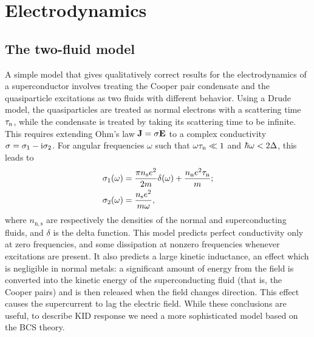 \section{Electrodynamics}
\label{sec:theory.electrodynamics}

\subsection{The two-fluid model}
\label{sec:theory.electrodynamics.two-fluid}


A simple model that gives qualitatively correct results for the electrodynamics of a superconductor involves treating the Cooper pair condensate and the quasiparticle excitations as two fluids with different behavior.
Using a Drude model, the quasiparticles are treated as normal electrons with a scattering time $\tau_{\mathrm{n}}$, while the condensate is treated by taking its scattering time to be infinite.
This requires extending Ohm's law
$\vb{J} = \sigma \vb{E}$
to a complex conductivity
$\sigma = \sigma_1 - \mathrm{i} \sigma_2$.
For angular frequencies $\omega$ such that
$\omega \tau_{\mathrm{n}} \ll 1$
and
$\hbar \omega < 2 \Delta$,
this leads to~\autocite{Tinkham2004}
\begin{align}
\sigma_1(\omega)
  &=
  \frac{\pi n_{\mathrm{s}} e^2}{2 m} \delta(\omega)
  + \frac{n_{\mathrm{n}} e^2 \tau_{\mathrm{n}}}{m}; \\
\sigma_2(\omega)
  &=
  \frac{n_{\mathrm{s}} e^2}{m \omega},
\label{eqn:two-fluid_conductivity}
\end{align}
where $n_\mathrm{n, s}$ are respectively the densities of the normal and superconducting fluids, and $\delta$ is the delta function.
This model predicts perfect conductivity only at zero frequencies, and some dissipation at nonzero frequencies whenever  excitations are present.
It also predicts a large kinetic inductance, an effect which is negligible in normal metals: a significant amount of energy from the field is converted into the kinetic energy of the superconducting fluid (that is, the Cooper pairs) and is then released when the field changes direction.
This effect causes the supercurrent to lag the electric field.
While these conclusions are useful, to describe KID response we need a more sophisticated model based on the BCS theory.


